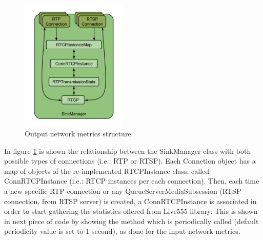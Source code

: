 \begin{figure}[!htb]
\begin{center}
\includegraphics[width=0.45\textwidth]{./images/SinkManager.png}
\caption{Output network metrics structure}
\label{F:onms}
\end{center}
\end{figure}

In figure \ref{F:onms} is shown the relationship between the SinkManager class with both possible types of connections (i.e.: RTP or RTSP). Each Connetion object has a map of objects of the re-implemented RTCPInstance class, called ConnRTCPInstance (i.e.: RTCP instances per each connection). Then, each time a new specific RTP connection or any QueueServerMediaSubsession (RTSP connection, from RTSP server) is created, a ConnRTCPInstance is associated in order to start gathering the statistics offered from Live555 library. This is shown in next piece of code by showing the method which is periodically called (default periodicity value is set to 1 second), as done for the input network metrics.

